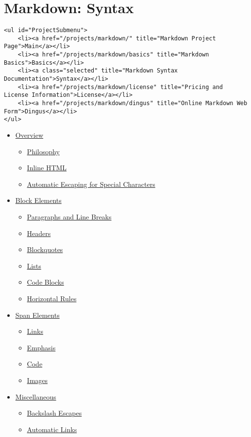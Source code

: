 \section*{Markdown: Syntax}


\begin{lstlisting}<ul id="ProjectSubmenu">
    <li><a href="/projects/markdown/" title="Markdown Project Page">Main</a></li>
    <li><a href="/projects/markdown/basics" title="Markdown Basics">Basics</a></li>
    <li><a class="selected" title="Markdown Syntax Documentation">Syntax</a></li>
    <li><a href="/projects/markdown/license" title="Pricing and License Information">License</a></li>
    <li><a href="/projects/markdown/dingus" title="Online Markdown Web Form">Dingus</a></li>
</ul>\end{lstlisting}


\begin{itemize}
\item \href{\#overview}{Overview}\begin{itemize}
\item \href{\#philosophy}{Philosophy}
\item \href{\#html}{Inline HTML}
\item \href{\#autoescape}{Automatic Escaping for Special Characters}
\end{itemize}

\item \href{\#block}{Block Elements}\begin{itemize}
\item \href{\#p}{Paragraphs and Line Breaks}
\item \href{\#header}{Headers}
\item \href{\#blockquote}{Blockquotes}
\item \href{\#list}{Lists}
\item \href{\#precode}{Code Blocks}
\item \href{\#hr}{Horizontal Rules}
\end{itemize}

\item \href{\#span}{Span Elements}\begin{itemize}
\item \href{\#link}{Links}
\item \href{\#em}{Emphasis}
\item \href{\#code}{Code}
\item \href{\#img}{Images}
\end{itemize}

\item \href{\#misc}{Miscellaneous}\begin{itemize}
\item \href{\#backslash}{Backslash Escapes}
\item \href{\#autolink}{Automatic Links}
\end{itemize}

\end{itemize}




